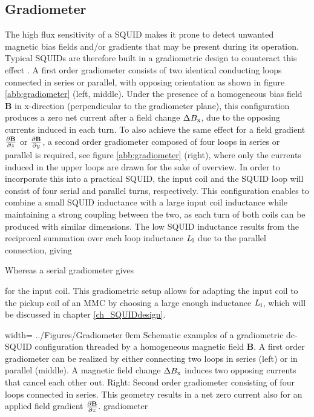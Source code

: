 \subsection{Gradiometer}\label{subsec_gradio}

The high flux sensitivity of a SQUID makes it prone to detect unwanted magnetic bias fields and/or gradients that may be present during its operation. Typical SQUIDs are therefore built in a gradiometric design to counteract this effect \cite{Ketchen1978}. A first order gradiometer consists of two identical conducting loops connected in series or parallel, with opposing orientation as shown in figure \ref{abb:gradiometer} (left, middle). Under the presence of a homogeneous bias field $\textbf{B}$ in x-direction (perpendicular to the gradiometer plane), this configuration produces a zero net current after a field change $\Delta B_{\rm x}$, due to the opposing currents induced in each turn. To also achieve the same effect for a field gradient $\frac{\partial \textbf{B}}{\partial z}$ or $\frac{\partial \textbf{B}}{\partial y}$, a second order gradiometer composed of four loops in series or parallel is required, see figure \ref{abb:gradiometer} (right), where only the currents induced in the upper loops are drawn for the sake of overview. In order to incorporate this into a practical SQUID, the input coil and the SQUID loop will consist of four serial and parallel turns, respectively. This configuration enables to combine a small SQUID inductance with a large input coil inductance while maintaining a strong coupling between the two, as each turn of both coils can be produced with similar dimensions. The low SQUID inductance results from the reciprocal summation over each loop inductance $L_{\rm l}$ due to the parallel connection, giving


Whereas a serial gradiometer gives 


for the input coil. This gradiometric setup allows for adapting the input coil to the pickup coil of an MMC by choosing a large enough inductance $L_{\rm i}$, which will be discussed in chapter \ref{ch_SQUIDdesign}. 

{width=\textwidth}
{../Figures/Gradiometer}
{0cm}   %
{Schematic examples of a gradiometric dc-SQUID configuration threaded by a homogeneous magnetic field $\textbf{B}$. A first order gradiometer can be realized by either connecting two loops in series (left) or in parallel (middle). A magnetic field change $\Delta B_{\rm x}$ induces two opposing currents that cancel each other out. Right: Second order gradiometer consisting of four loops connected in series. This geometry results in a net zero current also for an applied field gradient $\frac{\partial \textbf{B}}{\partial z}$.}
{gradiometer}
   
